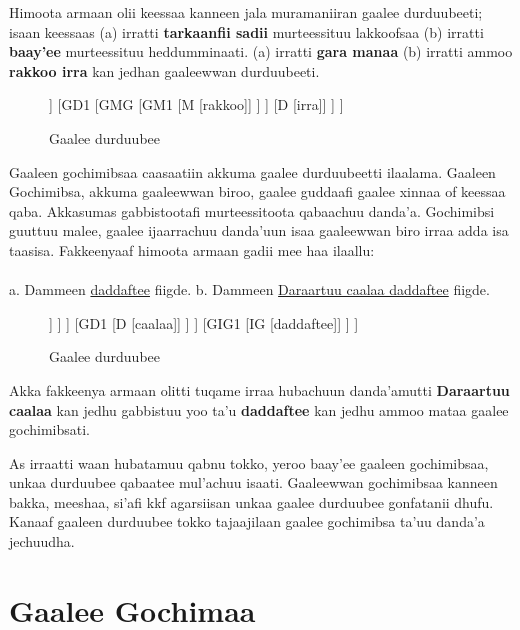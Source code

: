 \documentclass[11pt,b5paper]{book}
\begin{document}
 Himoota armaan olii keessaa kanneen jala muramaniiran  gaalee durduubeeti; isaan keessaas (a) irratti \textbf{tarkaanfii sadii} murteessituu lakkoofsaa (b) irratti \textbf{baay’ee} murteessituu heddumminaati. (a) irratti \textbf{gara manaa} (b) irratti ammoo \textbf{rakkoo irra} kan jedhan gaaleewwan durduubeeti.
  
 \begin{figure}[H]										
 	\caption{Gaalee durduubee}
 	\centering
 	\begin{forest}
 		[GDG
 			[MU [baay'ee]]
 			[GD1
 				[GMG
 					[GM1
 						[M [rakkoo]]
 					]
 				]
 				[D [irra]]
 			]
 		]
 	\end{forest}
 \end{figure}

Gaaleen gochimibsaa caasaatiin akkuma gaalee durduubeetti ilaalama. Gaaleen Gochimibsa, akkuma gaaleewwan biroo, gaalee guddaafi gaalee xinnaa of keessaa qaba. Akkasumas gabbistootafi murteessitoota qabaachuu danda’a. Gochimibsi guuttuu malee, gaalee ijaarrachuu danda’uun isaa gaaleewwan biro irraa adda isa taasisa. Fakkeenyaaf himoota armaan gadii mee haa ilaallu:\\
\\
a. Dammeen \underline{daddaftee} fiigde.
b. Dammeen \underline{Daraartuu caalaa daddaftee} fiigde. 

 \begin{figure}[H]										
	\caption{Gaalee durduubee}
	\centering
	\begin{forest}
		[GIGG
			[GDG
				[GMG
					[GM1
						[M [Daraartuu]]
					]
				]
				[GD1
					[D [caalaa]]
				]
			]
			[GIG1
				[IG [daddaftee]]
			]
		]
	\end{forest}
\end{figure}

Akka fakkeenya armaan olitti tuqame irraa hubachuun danda’amutti \textbf{Daraartuu caalaa} kan jedhu gabbistuu yoo ta’u \textbf{daddaftee} kan jedhu ammoo mataa gaalee gochimibsati.

As irraatti waan hubatamuu qabnu tokko, yeroo baay’ee gaaleen gochimibsaa, unkaa durduubee qabaatee mul’achuu
isaati. Gaaleewwan gochimibsaa kanneen bakka, meeshaa, si’afi kkf agarsiisan unkaa gaalee durduubee gonfatanii dhufu. Kanaaf gaaleen durduubee tokko tajaajilaan gaalee gochimibsa
ta’uu danda’a jechuudha.

\section{Gaalee Gochimaa}
\end{document}
